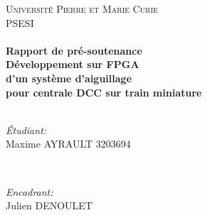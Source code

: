 \begin{titlepage}

\center %
 

\textsc{\LARGE Universit\'e Pierre et Marie Curie}\\[1.5cm] %
\textsc{\Large PSESI}\\[0.5cm] %


\HRule \\[0.4cm]
{ \huge \bfseries Rapport de pr\'e-soutenance}\\[0.4cm] %
{ \huge \bfseries D\'eveloppement sur FPGA \\d'un système d'aiguillage
  \\pour centrale DCC sur train miniature}\\[0.4cm] %
\HRule \\[1.5cm]
 

\begin{minipage}{0.4\textwidth}
\begin{flushleft} \large
\emph{\'Etudiant:}\\
Maxime \textsc{AYRAULT} 3203694 %
\end{flushleft}
\end{minipage}
~
\begin{minipage}{0.4\textwidth}
\begin{flushright} \large
\emph{Encadrant:} \\
Julien \textsc{DENOULET} %
\end{flushright}
\end{minipage}\\[2cm]



\end{titlepage}

